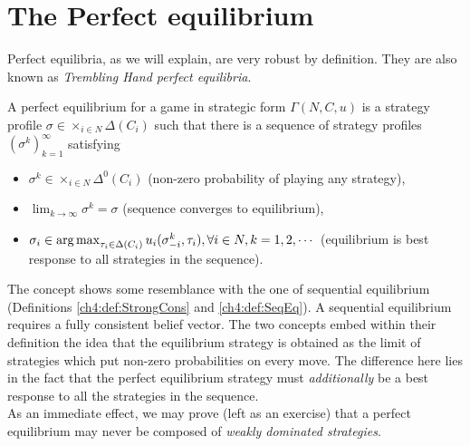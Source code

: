 \section{The Perfect equilibrium}

Perfect equilibria, as we will explain, are very robust by definition. They are also known as \emph{Trembling Hand perfect equilibria}.\\
\begin{definition}
A perfect equilibrium for a game in strategic form $\Gamma(N,C,u)$ is a strategy profile $\sigma \in \times_{i \in N} \Delta (C_i)$ such that there is a sequence of strategy profiles $ (\sigma^k)_{k = 1}^\infty$ satisfying 
\begin{itemize}
\item $\sigma^k \in \times_{i \in N} \Delta^0 (C_i)$ (non-zero probability of playing any strategy), 
\item $\lim_{k \rightarrow \infty} \sigma^k = \sigma$ (sequence converges to equilibrium), 
\item $ \sigma_i \in \operatorname*{arg\,max}_{\tau_i \in \Delta(C_i)}u_i(\sigma^k_{-i}, \tau_i), \forall i \in N, k = 1,2, \cdots $ (equilibrium is best response to all strategies in the sequence).
\end{itemize}
\label{ch5:def:perfectEq}
\end{definition}
The concept shows some resemblance with the one of sequential equilibrium (Definitions \ref{ch4:def:StrongCons} and \ref{ch4:def:SeqEq}). A sequential equilibrium requires a fully consistent belief vector. The two concepts embed within their definition the idea that the equilibrium strategy is obtained as the limit of strategies which put non-zero probabilities on every move. The difference here lies in the fact that the perfect equilibrium strategy must \emph{additionally} be a best response to all the strategies in the sequence. \\
As an immediate effect, we may prove (left as an exercise) that a perfect equilibrium may never be composed of \emph{weakly dominated strategies}. 
